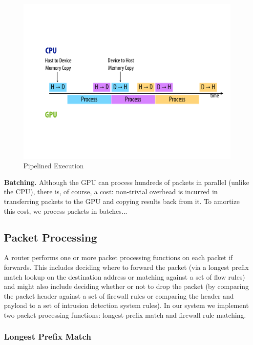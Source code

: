 \begin{figure}
   \centering
   \includegraphics[scale=0.25]{figs/pipelining.pdf}
   \caption{Pipelined Execution}
   \label{fig:pipelining}
\end{figure}

\noindent \textbf{Batching.} Although the GPU can process hundreds of packets
in parallel (unlike the CPU), there is, of course, a cost: non-trivial overhead
is incurred in transferring packets to the GPU and copying results back from
it. To amortize this cost, we process packets in batches... 

\subsection{Packet Processing}

A router performs one or more packet processing functions on each packet if
forwards. This includes deciding where to forward the packet (via a longest
prefix match lookup on the destination address or matching against a set of
flow rules) and might also include deciding whether or not to drop the packet
(by comparing the packet header against a set of firewall rules or comparing
the header and payload to a set of intrusion detection system rules).  In our
system we implement two packet processing functions: longest prefix match and
firewall rule matching. 

\subsubsection{Longest Prefix Match}

